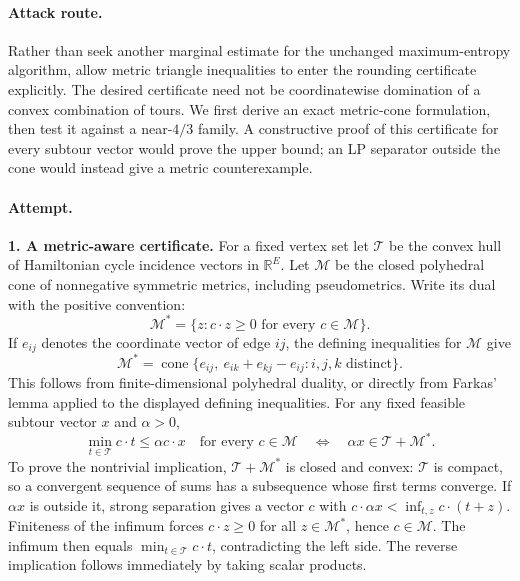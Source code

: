 \documentclass[11pt,a4paper]{article}
\newcommand{\R}{\mathbb{R}}
\numberwithin{equation}{section}
\begin{document}
\paragraph{Attack route.}
Rather than seek another marginal estimate for the unchanged
maximum-entropy algorithm, allow metric triangle inequalities to enter
the rounding certificate explicitly. The desired certificate need not
be coordinatewise domination of a convex combination of tours.
We first derive an exact metric-cone formulation, then test it against
a near-$4/3$ family. A constructive proof of this certificate for every
subtour vector would prove the upper bound; an LP separator outside
the cone would instead give a metric counterexample.

\paragraph{Attempt.}
\textbf{1. A metric-aware certificate.}
For a fixed vertex set let $\mathcal T$ be the convex hull of Hamiltonian
cycle incidence vectors in $\R^E$. Let $\mathcal M$ be the closed
polyhedral cone of nonnegative symmetric metrics, including
pseudometrics. Write its dual with the positive convention:
\[
 \mathcal M^*=\{z:c\cdot z\ge0\text{ for every }c\in\mathcal M\}.
\]
If $e_{ij}$ denotes the coordinate vector of edge $ij$, the defining
inequalities for $\mathcal M$ give
\[
 \mathcal M^*=\operatorname{cone}
 \{e_{ij},\ e_{ik}+e_{kj}-e_{ij}: i,j,k\text{ distinct}\}.
\]
This follows from finite-dimensional polyhedral duality, or directly
from Farkas' lemma applied to the displayed defining inequalities.
For any fixed feasible subtour vector $x$ and $\alpha>0$,
\begin{equation}\label{eq:199:dual}
 \min_{t\in\mathcal T}c\cdot t\le\alpha c\cdot x
 \quad\text{for every }c\in\mathcal M
 \quad\Longleftrightarrow\quad
               \alpha x\in\mathcal T+\mathcal M^*.
\end{equation}
To prove the nontrivial implication, $\mathcal T+\mathcal M^*$ is
closed and convex: $\mathcal T$ is compact, so a convergent sequence
of sums has a subsequence whose first terms converge. If $\alpha x$
is outside it, strong separation gives a vector $c$ with
$c\cdot\alpha x<\inf_{t,z}c\cdot(t+z)$. Finiteness of the infimum
forces $c\cdot z\ge0$ for all $z\in\mathcal M^*$, hence
$c\in\mathcal M$. The infimum then equals
$\min_{t\in\mathcal T}c\cdot t$, contradicting the left side.
The reverse implication follows immediately by taking scalar products.
\end{document}
